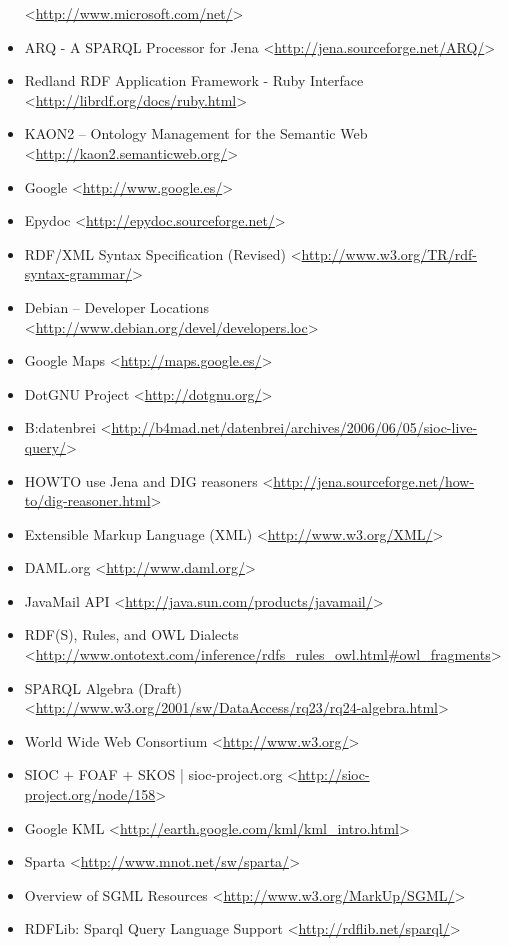 \begin{itemize}
 <\url{http://www.microsoft.com/net/}>
 \item ARQ - A SPARQL Processor for Jena
 <\url{http://jena.sourceforge.net/ARQ/}>
 \item Redland RDF Application Framework - Ruby Interface
 <\url{http://librdf.org/docs/ruby.html}>
 \item KAON2 -- Ontology Management for the Semantic Web
 <\url{http://kaon2.semanticweb.org/}>
 \item Google
 <\url{http://www.google.es/}>
 \item Epydoc
 <\url{http://epydoc.sourceforge.net/}>
 \item RDF/XML Syntax Specification (Revised)
 <\url{http://www.w3.org/TR/rdf-syntax-grammar/}>
 \item Debian -- Developer Locations
 <\url{http://www.debian.org/devel/developers.loc}>
 \item Google Maps
 <\url{http://maps.google.es/}>
 \item DotGNU Project
 <\url{http://dotgnu.org/}>
 \item B:datenbrei
 <\url{http://b4mad.net/datenbrei/archives/2006/06/05/sioc-live-query/}>
 \item HOWTO use Jena and DIG reasoners
 <\url{http://jena.sourceforge.net/how-to/dig-reasoner.html}>
 \item Extensible Markup Language (XML)
 <\url{http://www.w3.org/XML/}>
 \item DAML.org
 <\url{http://www.daml.org/}>
 \item JavaMail API
 <\url{http://java.sun.com/products/javamail/}>
 \item RDF(S), Rules, and OWL Dialects
 <\url{http://www.ontotext.com/inference/rdfs_rules_owl.html\#owl_fragments}>
 \item SPARQL Algebra (Draft)
 <\url{http://www.w3.org/2001/sw/DataAccess/rq23/rq24-algebra.html}>
 \item World Wide Web Consortium
 <\url{http://www.w3.org/}>
 \item SIOC + FOAF + SKOS | sioc-project.org
 <\url{http://sioc-project.org/node/158}>
 \item Google KML
 <\url{http://earth.google.com/kml/kml_intro.html}>
 \item Sparta
 <\url{http://www.mnot.net/sw/sparta/}>
 \item Overview of SGML Resources
 <\url{http://www.w3.org/MarkUp/SGML/}>
 \item RDFLib: Sparql Query Language Support
 <\url{http://rdflib.net/sparql/}>

\end{itemize}
